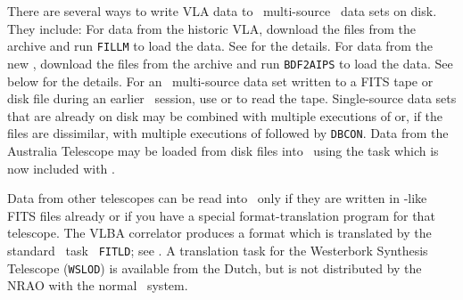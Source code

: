 
     There are several ways to write VLA data to \AIPS\ multi-source
\uv\ data sets on disk. They include:
\xben
\Item For data from the historic VLA, download the files from the
    archive and run {\tt FILLM} to load the data.  See 
    for the details.
\Item For data from the new , download the files from the
    archive and run {\tt BDF2AIPS} to load the data.  See
     below for the details.
\Item For an \AIPS\ multi-source data set written to a FITS tape or
    disk file during an earlier \AIPS\ session, use {\tt {}}
    or {\tt {}} to read the tape.
\Item Single-source data sets that are already on disk may be combined
    with multiple executions of {\tt {}} or, if the files
    are dissimilar, with multiple executions of {\tt {}}
    followed by {\tt DBCON}\@.
\Item Data from the Australia Telescope may be loaded from disk files
    into \AIPS\ using the task {\tt {}} which is now
    included with \AIPS\@.
\xeen

     Data from other telescopes can be read into \AIPS\ only if they
are written in \AIPS-like FITS files already or if you have a special
format-translation program for that telescope.  The VLBA correlator
produces a format which is translated by the standard \AIPS\ task {\tt
FITLD}; see .  A translation task for the Westerbork
Synthesis Telescope ({\tt WSLOD}) is available from the Dutch,
but is not distributed by the NRAO with the normal \AIPS\ system.


